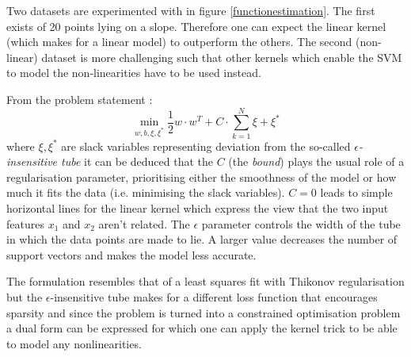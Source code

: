 

Two datasets are experimented with in figure \ref{functionestimation}. The first exists of 20 points lying on a slope. Therefore one can expect the linear kernel (which makes for a linear model) to outperform the others. The second (non-linear) dataset is more challenging such that other kernels which enable the SVM to model the non-linearities have to be used instead. 

\par From the problem statement :
$$\min_{w,b,\xi,\xi^*}\frac{1}{2}w\cdot w^T+C\cdot\sum_{k=1}^N\xi+\xi^*$$
where $\xi,\xi^*$ are slack variables representing deviation from the so-called \textit{$\epsilon$-insensitive tube} it can be deduced that the $C$ (the \textit{bound}) plays the usual role of a regularisation parameter, prioritising either the smoothness of the model or how much it fits the data (i.e. minimising the slack variables). $C=0$ leads to simple horizontal lines for the linear kernel which express the view that the two input features $x_1$ and $x_2$ aren't related. The $\epsilon$ parameter controls the width of the tube in which the data points are made to lie. A larger value decreases the number of support vectors and makes the model less accurate.

\par The formulation resembles that of a least squares fit with Thikonov regularisation but the $\epsilon$-insensitive tube makes for a different loss function that encourages sparsity and since the problem is turned into a constrained optimisation problem a dual form can be expressed for which one can apply the kernel trick to be able to model any nonlinearities.

